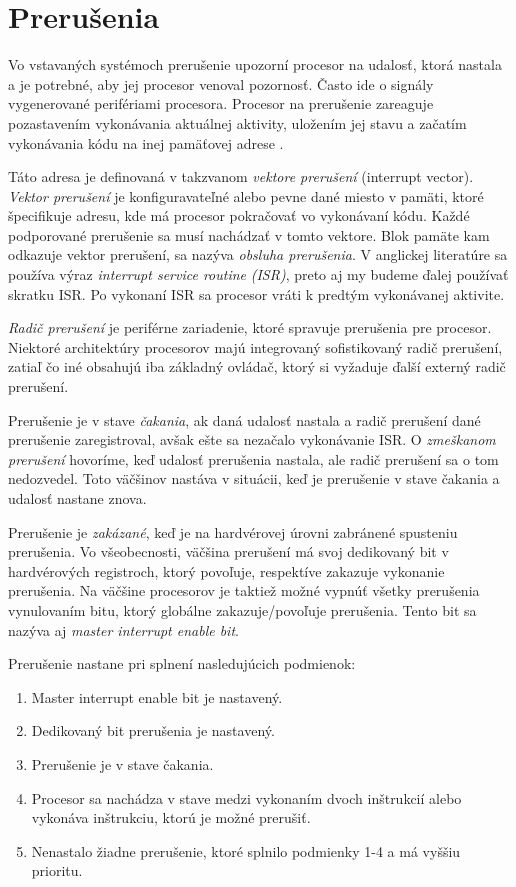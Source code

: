 \section{Prerušenia}
\noindent Vo vstavaných systémoch prerušenie upozorní procesor na udalosť, ktorá nastala a je potrebné, aby jej procesor venoval pozornosť. Často ide o signály vygenerované perifériami procesora. Procesor na prerušenie zareaguje pozastavením vykonávania aktuálnej aktivity, uložením jej stavu a začatím vykonávania kódu na inej pamäťovej adrese \cite{wangAutomaticDetectionValidation2017}. \par 
Táto adresa je definovaná v takzvanom \textit{vektore prerušení} (interrupt vector). \textit{Vektor prerušení} je konfiguravateľné alebo pevne dané miesto v pamäti, ktoré špecifikuje adresu, kde má procesor pokračovať vo vykonávaní kódu. Každé podporované prerušenie sa musí nachádzať v tomto vektore. Blok pamäte kam odkazuje vektor prerušení, sa nazýva \textit{obsluha prerušenia}. V anglickej literatúre sa používa výraz \textit{interrupt service routine} \textit{(ISR)}, preto aj my budeme ďalej používať skratku  ISR. Po vykonaní  ISR sa procesor vráti k predtým vykonávanej aktivite. \par
\textit{Radič prerušení} je periférne zariadenie, ktoré spravuje prerušenia pre procesor. Niektoré architektúry procesorov majú integrovaný sofistikovaný radič prerušení, zatiaľ čo iné obsahujú iba základný ovládač, ktorý si vyžaduje ďalší externý radič prerušení. \par
Prerušenie je v stave \textit{čakania}, ak daná udalosť nastala a radič prerušení dané prerušenie zaregistroval, avšak ešte sa nezačalo vykonávanie ISR.  O \textit{zmeškanom prerušení} hovoríme, keď udalosť prerušenia nastala, ale radič prerušení sa o tom nedozvedel. Toto väčšinov nastáva v situácii, keď je prerušenie v stave čakania a udalosť nastane znova. \par
Prerušenie je \textit{zakázané}, keď je na hardvérovej úrovni zabránené spusteniu prerušenia. Vo všeobecnosti, väčšina prerušení má svoj dedikovaný bit v hardvérových registroch, ktorý povoľuje, respektíve zakazuje vykonanie prerušenia. Na väčšine procesorov je taktiež možné vypnúť všetky prerušenia vynulovaním bitu, ktorý globálne zakazuje/povoľuje prerušenia. Tento bit sa nazýva aj \textit{master interrupt enable bit}.\par 
Prerušenie nastane pri splnení nasledujúcich podmienok:
\begin{enumerate}
    \item Master interrupt enable bit je nastavený.
    \item Dedikovaný bit prerušenia je nastavený.
    \item Prerušenie je v stave čakania.
    \item Procesor sa nachádza v stave medzi vykonaním dvoch inštrukcií alebo vykonáva inštrukciu, ktorú je možné prerušiť.
    \item Nenastalo žiadne prerušenie, ktoré splnilo podmienky 1-4 a má vyššiu prioritu.
\end{enumerate} \par

